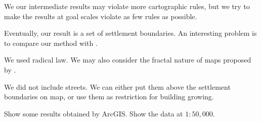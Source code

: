 \documentclass[graybox]{svmult}
\begin{document}
We our intermediate results may violate more cartographic rules, but we try to 
make the results at goal scales violate as few rules as possible.


Eventually, our result is a set of settlement boundaries. An interesting 
problem is to compare our method with \textcite{Chaudhry2008}.

We used radical law. We may also consider the fractal nature of maps proposed 
by \textcite{Jiang2015}.

We did not include streets. We can either put them above the settlement 
boundaries on map, or use them as restriction for building growing.

Show some results obtained by ArcGIS.
Show the data at $1:50{,}000$.


\printbibliography
\end{document}
